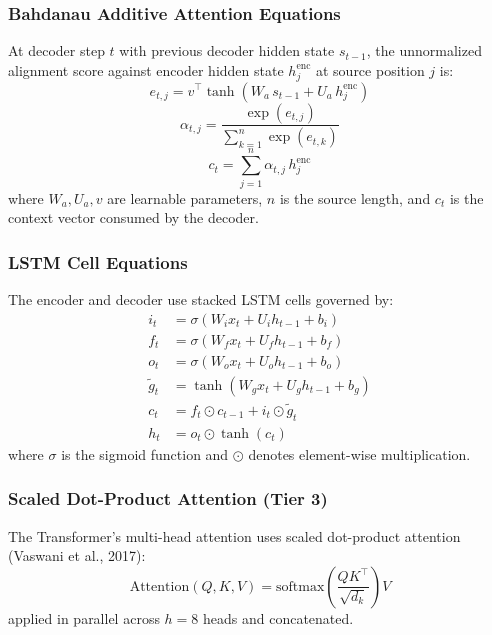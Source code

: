 \documentclass[11pt]{article}
\begin{document}
\subsubsection{Bahdanau Additive Attention Equations}
At decoder step $t$ with previous decoder hidden state $s_{t-1}$, the unnormalized alignment score against encoder hidden state $h_j^{\text{enc}}$ at source position $j$ is:
\begin{equation}
e_{t,j} = v^\top \tanh\!\left(W_a\, s_{t-1} + U_a\, h_j^{\text{enc}}\right)
\end{equation}
\begin{equation}
\alpha_{t,j} = \frac{\exp(e_{t,j})}{\sum_{k=1}^{n}\exp(e_{t,k})}
\end{equation}
\begin{equation}
c_t = \sum_{j=1}^{n} \alpha_{t,j}\, h_j^{\text{enc}}
\end{equation}
where $W_a, U_a, v$ are learnable parameters, $n$ is the source length, and $c_t$ is the context vector consumed by the decoder.

\subsubsection{LSTM Cell Equations}
The encoder and decoder use stacked LSTM cells governed by:
\begin{align}
i_t &= \sigma(W_i x_t + U_i h_{t-1} + b_i) \\
f_t &= \sigma(W_f x_t + U_f h_{t-1} + b_f) \\
o_t &= \sigma(W_o x_t + U_o h_{t-1} + b_o) \\
\tilde{g}_t &= \tanh(W_g x_t + U_g h_{t-1} + b_g) \\
c_t &= f_t \odot c_{t-1} + i_t \odot \tilde{g}_t \\
h_t &= o_t \odot \tanh(c_t)
\end{align}
where $\sigma$ is the sigmoid function and $\odot$ denotes element-wise multiplication.

\subsubsection{Scaled Dot-Product Attention (Tier 3)}
The Transformer's multi-head attention uses scaled dot-product attention (Vaswani et al., 2017):
\begin{equation}
\mathrm{Attention}(Q, K, V) = \mathrm{softmax}\!\left(\frac{Q K^\top}{\sqrt{d_k}}\right) V
\end{equation}
applied in parallel across $h{=}8$ heads and concatenated.
\end{document}
